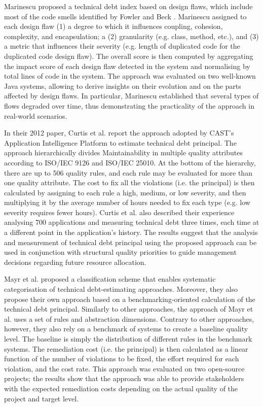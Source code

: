 Marinescu \cite{Marinescu2012} proposed a technical debt index based on design flaws, which include most of the code smells identified by Fowler and Beck \cite{Fowler2002}.
Marinescu assigned to each design flaw (1) a degree to which it influences coupling, cohesion, complexity, and encapsulation; a (2) granularity (e.g. class, method, etc.), and (3) a metric that influences their severity (e.g. length of duplicated code for the duplicated code design flaw).
The overall score is then computed by aggregating the impact score of each design flaw detected in the system and normalising by total lines of code in the system.
The approach was evaluated on two well-known Java systems, allowing to derive insights on their evolution and on the parts affected by design flaws.
In particular, Marinescu established that several types of flows degraded over time, thus demonstrating the practicality of the approach in real-world scenarios.

In their 2012 paper, Curtis et al. \cite{Curtis2012} report the approach adopted by CAST's Application Intelligence Platform to estimate technical debt principal.
The approach hierarchically divides Maintainability in multiple quality attributes according to ISO/IEC 9126 and ISO/IEC 25010.
At the bottom of the hierarchy, there are up to 506 quality rules, and each rule may be evaluated for more than one quality attribute.
The cost to fix all the violations (i.e. the principal) is then calculated by assigning to each rule a high, medium, or low severity, and then multiplying it by the average number of hours needed to fix each type (e.g. low severity requires fewer hours).
Curtis et al. also described their experience analysing 700 applications and measuring technical debt three times, each time at a different point in the application's history.
The results suggest that the analysis and measurement of technical debt principal using the proposed approach can be used in conjunction with structural quality priorities to guide management decisions regarding future resource allocation.

Mayr et al. \cite{Mayr2014} proposed a classification scheme that enables systematic categorisation of technical debt-estimating approaches.
Moreover, they also propose their own approach based on a benchmarking-oriented calculation of the technical debt principal.
Similarly to other approaches, the approach of Mayr et al. uses a set of rules and abstraction dimensions.
Contrary to other approaches, however, they also rely on a benchmark of systems to create a baseline quality level.
The baseline is simply the distribution of different rules in the benchmark systems.
The remediation cost (i.e. the principal) is then calculated as a linear function of the number of violations to be fixed, the effort required for each violation, and the cost rate.
This approach was evaluated on two open-source projects; the results show that the approach was able to provide stakeholders with the expected remediation costs depending on the actual quality of the project and target level.

